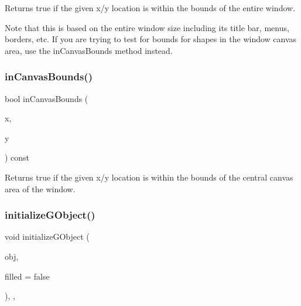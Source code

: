 Returns true if the given x/y location is within the bounds of the entire window. 

Note that this is based on the entire window size including its title bar, menus, borders, etc. If you are trying to test for bounds for shapes in the window canvas area, use the in\+Canvas\+Bounds method instead. \mbox{\label{classsgl_1_1GWindow_ae94c9ea850cba190c985dae9fc120d32}} 
\subsubsection{\texorpdfstring{in\+Canvas\+Bounds()}{inCanvasBounds()}}
{\footnotesize\ttfamily bool in\+Canvas\+Bounds (\begin{DoxyParamCaption}\item[{double}]{x,  }\item[{double}]{y }\end{DoxyParamCaption}) const\hspace{0.3cm}{\ttfamily [virtual]}}



Returns true if the given x/y location is within the bounds of the central canvas area of the window. 

\mbox{\label{classsgl_1_1GDrawingSurface_a814498efebc5586645159cd22990cf61}} 
\subsubsection{\texorpdfstring{initialize\+G\+Object()}{initializeGObject()}\hspace{0.1cm}{\footnotesize\ttfamily [1/2]}}
{\footnotesize\ttfamily void initialize\+G\+Object (\begin{DoxyParamCaption}\item[{\mbox{\hyperlink{classsgl_1_1GObject}{G\+Object}} \&}]{obj,  }\item[{bool}]{filled = {\ttfamily false} }\end{DoxyParamCaption})\hspace{0.3cm}{\ttfamily [protected]}, {\ttfamily [virtual]}, {\ttfamily [inherited]}}



